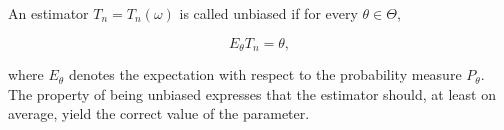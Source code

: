 An estimator $T_n = T_n(\omega)$ is called unbiased if for every $\theta \in \Theta$,

$$E_\theta T_n = \theta,$$

where $E_\theta$ denotes the expectation with respect to the probability measure $P_\theta$. The property of being unbiased expresses that the estimator should, at least on average, yield the correct value of the parameter.
